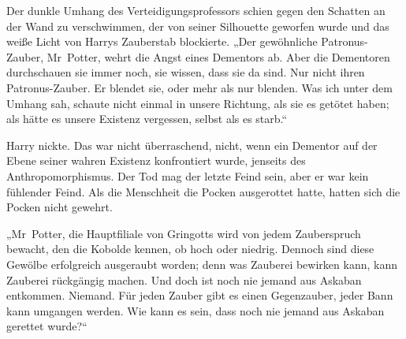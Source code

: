 Der dunkle Umhang des Verteidigungsprofessors schien gegen den Schatten an der Wand zu verschwimmen, der von seiner Silhouette geworfen wurde und das weiße Licht von Harrys Zauberstab blockierte.
„Der gewöhnliche Patronus-Zauber, Mr~Potter, wehrt die Angst eines Dementors ab. Aber die Dementoren durchschauen sie immer noch, sie wissen, dass sie da sind. Nur nicht ihren Patronus-Zauber. Er blendet sie, oder mehr als nur blenden. Was ich unter dem Umhang sah, schaute nicht einmal in unsere Richtung, als sie es getötet haben; als hätte es unsere Existenz vergessen, selbst als es starb.“

Harry nickte. Das war nicht überraschend, nicht, wenn ein Dementor auf der Ebene seiner wahren Existenz konfrontiert wurde, jenseits des Anthropomorphismus. Der Tod mag der letzte Feind sein, aber er war kein fühlender Feind. Als die Menschheit die Pocken ausgerottet hatte, hatten sich die Pocken nicht gewehrt.

„Mr~Potter, die Hauptfiliale von Gringotts wird von jedem Zauberspruch bewacht, den die Kobolde kennen, ob hoch oder niedrig. Dennoch sind diese Gewölbe erfolgreich ausgeraubt worden; denn was Zauberei bewirken kann, kann Zauberei rückgängig machen. Und doch ist noch nie jemand aus Askaban entkommen. Niemand. Für jeden Zauber gibt es einen Gegenzauber, jeder Bann kann umgangen werden. Wie kann es sein, dass noch nie jemand aus Askaban gerettet wurde?“


